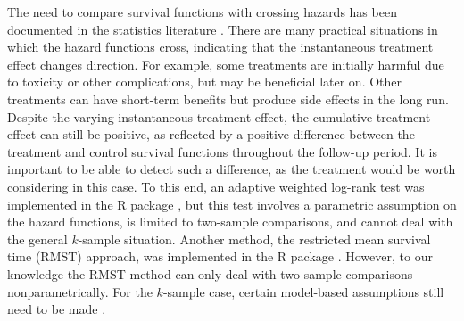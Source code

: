 The need to compare survival functions with crossing hazards has been documented in the statistics literature \citep[see, e.g.,][]{PF:1989, YP:2010}. 
There are many practical situations in which the hazard functions cross, indicating that the instantaneous treatment effect changes direction.
For example, some treatments are initially harmful due to toxicity or other complications, but may be beneficial later on. Other treatments can have short-term benefits but produce side effects in the long run.
Despite the varying instantaneous treatment effect, the cumulative treatment effect can still be positive, as reflected by a positive difference between the treatment and control survival functions throughout the follow-up period. It is important to be able to detect such a difference, as the treatment would be worth considering in this case. %
To this end, an adaptive weighted log-rank test was implemented in  the R  package  \citep[][]{YPmodel:2015}, but this test involves a parametric assumption on the hazard functions, is limited to two-sample comparisons, and cannot deal with the general $k$-sample situation.
Another method, the restricted mean survival time (RMST) approach,  was implemented in  the R  package  \citep[][]{survRM2:2017}. However, to our knowledge the RMST method can only deal with two-sample comparisons nonparametrically. For the $k$-sample case, certain model-based assumptions still need to be made \citep[see, e.g.,][]{CTU:2016}.


